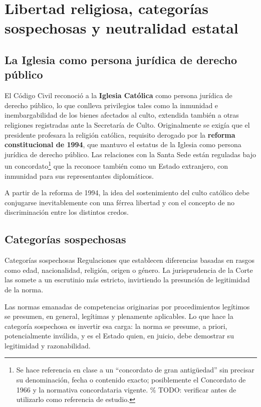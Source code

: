 \documentclass[12pt,oneside]{book}
\begin{document}
\chapter[Libertad religiosa]{Libertad religiosa, categorías sospechosas y neutralidad estatal}

\section{La Iglesia como persona jurídica de derecho público}

El Código Civil reconoció a la \textbf{Iglesia Católica} como persona jurídica de derecho público, lo que conlleva privilegios tales como la inmunidad e inembargabilidad de los bienes afectados al culto, extendida también a otras religiones registradas ante la Secretaría de Culto. Originalmente se exigía que el presidente profesara la religión católica, requisito derogado por la \textbf{reforma constitucional de 1994}, que mantuvo el estatus de la Iglesia como persona jurídica de derecho público. Las relaciones con la Santa Sede están reguladas bajo un concordato\footnote{Se hace referencia en clase a un ``concordato de gran antigüedad'' sin precisar su denominación, fecha o contenido exacto; posiblemente el Concordato de 1966 y la normativa concordataria vigente. \% TODO: verificar antes de utilizarlo como referencia de estudio.} que la reconoce también como un Estado extranjero, con inmunidad para sus representantes diplomáticos.

A partir de la reforma de 1994, la idea del sostenimiento del culto católico debe conjugarse inevitablemente con una férrea libertad y con el concepto de no discriminación entre los distintos credos.

\section{Categorías sospechosas}

\begin{definition}{Categorías sospechosas}
Regulaciones que establecen diferencias basadas en rasgos como edad, nacionalidad, religión, origen o género. La jurisprudencia de la Corte las somete a un escrutinio más estricto, invirtiendo la presunción de legitimidad de la norma.
\end{definition}

Las normas emanadas de competencias originarias por procedimientos legítimos se presumen, en general, legítimas y plenamente aplicables. Lo que hace la categoría sospechosa es invertir esa carga: la norma se presume, a priori, potencialmente inválida, y es el Estado quien, en juicio, debe demostrar su legitimidad y razonabilidad.
\end{document}
